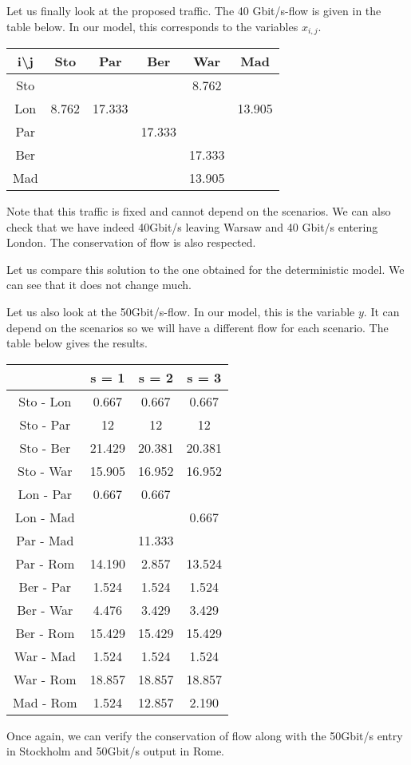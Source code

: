 Let us finally look at the proposed traffic. The 40 Gbit/s-flow is given in the table below. In our model, this corresponds to the variables $x_{i,j}$.
\begin{center}
\begin{tabular}{|c|c|c|c|c|c|}
\hline 
i\textbackslash j & Sto & Par & Ber & War & Mad \\ 
\hline 
Sto &  &  &  & 8.762 &  \\ 
\hline 
Lon & 8.762 & 17.333 &  &  & 13.905 \\ 
\hline 
Par &  &  & 17.333 &  &  \\ 
\hline 
Ber &  &  &  & 17.333 &  \\ 
\hline 
Mad &  &  &  & 13.905 &  \\ 
\hline 
\end{tabular} 
\end{center}

Note that this traffic is fixed and cannot depend on the scenarios. We can also check that we have indeed 40Gbit/s leaving Warsaw and 40 Gbit/s entering London. The conservation of flow is also respected. 

Let us compare this solution to the one obtained for the deterministic model. We can see that it does not change much. 

Let us also look at the 50Gbit/s-flow. In our model, this is the variable $y$. It can depend on the scenarios so we will have a different flow for each scenario. The table below gives the results.

\begin{center}
\begin{tabular}{|c|c|c|c|}
\hline 
 & s = 1 & s = 2 & s = 3 \\ 
\hline 
Sto - Lon & 0.667 & 0.667 & 0.667 \\ 
\hline 
Sto - Par & 12 & 12 & 12 \\ 
\hline 
Sto - Ber & 21.429 & 20.381 & 20.381 \\ 
\hline 
Sto - War & 15.905 & 16.952 & 16.952 \\ 
\hline 
Lon - Par & 0.667 & 0.667 &  \\ 
\hline 
Lon - Mad &  &  & 0.667 \\ 
\hline 
Par - Mad &  & 11.333 &  \\ 
\hline 
Par - Rom & 14.190 & 2.857 & 13.524 \\ 
\hline 
Ber - Par & 1.524 & 1.524 & 1.524 \\ 
\hline 
Ber - War & 4.476 & 3.429 & 3.429 \\ 
\hline 
Ber - Rom & 15.429 & 15.429 & 15.429 \\ 
\hline 
War - Mad & 1.524 & 1.524 & 1.524 \\ 
\hline 
War - Rom & 18.857 & 18.857 & 18.857 \\ 
\hline 
Mad - Rom & 1.524 & 12.857 & 2.190 \\ 
\hline 
\end{tabular} 
\end{center}

Once again, we can verify the conservation of flow along with the 50Gbit/s entry in Stockholm and 50Gbit/s output in Rome.